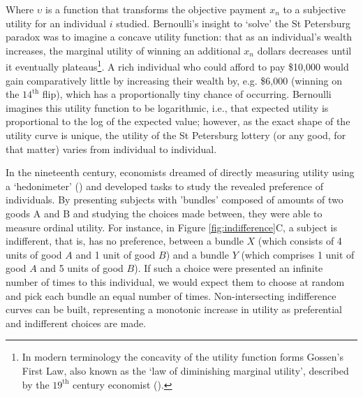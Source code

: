 Where $\upsilon$ is a function that transforms the objective payment $x_{n}$ to a subjective utility for an individual $i$ studied. Bernoulli’s insight to ‘solve’ the St Petersburg paradox was to imagine a concave utility function: that as an individual’s wealth increases, the marginal utility of winning an additional $x_{n}$ dollars decreases until it eventually plateaus\footnote{In modern terminology the concavity of the utility function forms Gossen’s First Law, also known as the ‘law of diminishing marginal utility’, described by the $19^{\text{th}}$ century economist (\cite{gossen1983laws}).}. A rich individual who could afford to pay \$10,000 would gain comparatively little by increasing their wealth by, e.g. \$6,000 (winning on the $14^{\text{th}}$ flip), which has a proportionally tiny chance of occurring. Bernoulli imagines this utility function to be logarithmic, i.e., that expected utility is proportional to the log of the expected value; however, as the exact shape of the utility curve is unique, the utility of the St Petersburg lottery (or any good, for that matter) varies from individual to individual.

In the nineteenth century, economists dreamed of directly measuring utility using a ‘hedonimeter’ (\cite{edgeworth1881mathematical}) and developed tasks to study the revealed preference of individuals. By presenting subjects with 'bundles' composed of amounts of two goods A and B and studying the choices made between, they were able to measure ordinal utility. For instance, in Figure \ref{fig:indifference}C, a subject is indifferent, that is, has no preference, between a bundle $X$ (which consists of 4 units of good $A$ and 1 unit of good $B$) and a bundle $Y$ (which comprises 1 unit of good $A$ and 5 units of good $B$). If such a choice were presented an infinite number of times to this individual, we would expect them to choose at random and pick each bundle an equal number of times. Non-intersecting indifference curves can be built, representing a monotonic increase in utility as preferential and indifferent choices are made.

